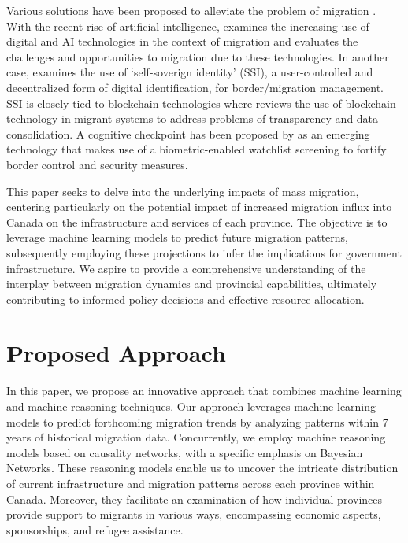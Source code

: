 \documentclass[conference]{IEEEtran}
\begin{document}
	Various solutions have been proposed to alleviate the problem of migration \cite{mcauliffe2021digitalization, cheesman2022self, corte2022blockchain, yanushkevich2019cognitive, bi2021integrated}. With the recent rise of artificial intelligence, \cite{mcauliffe2021digitalization} examines the increasing use of digital and AI technologies in the context of migration and evaluates the challenges and opportunities to migration due to these technologies.  In another case, \cite{cheesman2022self} examines the use of `self-soverign identity' (SSI), a user-controlled and decentralized form of digital identification, for border/migration management. SSI is closely tied to blockchain technologies where \cite{corte2022blockchain} reviews the use of blockchain technology in migrant systems to address problems of transparency and data consolidation.  A cognitive checkpoint has been proposed by \cite{yanushkevich2019cognitive} as an emerging technology that makes use of a biometric-enabled watchlist screening to fortify border control and security measures.
	
	This paper seeks to delve into the underlying impacts of mass migration, centering particularly on the potential impact of increased migration influx into Canada on the infrastructure and services of each province. The objective is to leverage machine learning models to predict future migration patterns, subsequently employing these projections to infer the implications for government infrastructure. We aspire to provide a comprehensive understanding of the interplay between migration dynamics and provincial capabilities, ultimately contributing to informed policy decisions and effective resource allocation.
	
	\section{Proposed Approach}
	In this paper, we propose an innovative approach that combines machine learning and machine reasoning techniques. Our approach leverages machine learning models to predict forthcoming migration trends by analyzing patterns within 7 years of historical migration data. Concurrently, we employ machine reasoning models based on causality networks, with a specific emphasis on Bayesian Networks. These reasoning models enable us to uncover the intricate distribution of current infrastructure and migration patterns across each province within Canada. Moreover, they facilitate an examination of how individual provinces provide support to migrants in various ways, encompassing economic aspects, sponsorships, and refugee assistance.
	
\end{document}
